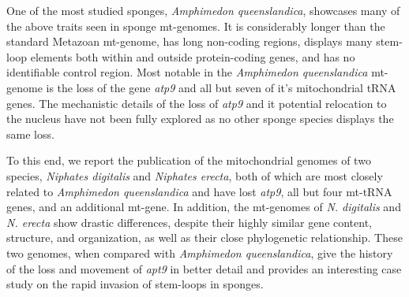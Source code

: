 \documentclass[../main.tex]{subfiles}
\begin{document}
One of the most studied sponges, \emph{Amphimedon queenslandica}, showcases many of the above traits seen in sponge mt-genomes. It is considerably longer than the standard Metazoan mt-genome, has long non-coding regions, displays many stem-loop elements both within and outside protein-coding genes, and has no identifiable control region. Most notable in the \emph{Amphimedon queenslandica} mt-genome is the loss of the gene \emph{atp9} and all but seven of it's mitochondrial tRNA genes. The mechanistic details of the loss of \emph{atp9} and it potential relocation to the nucleus have not been fully explored as no other sponge species displays the same loss.

To this end, we report the publication of the mitochondrial genomes of two species, \emph{Niphates digitalis} and \emph{Niphates erecta}, both of which are most closely related to \emph{Amphimedon queenslandica} and have lost \emph{atp9}, all but four mt-tRNA genes, and an additional mt-gene. In addition, the mt-genomes of \emph{N. digitalis} and \emph{N. erecta} show drastic differences, despite their highly similar gene content, structure, and organization, as well as their close phylogenetic relationship. These two genomes, when compared with \emph{Amphimedon queenslandica}, give the history of the loss and movement of \emph{apt9} in better detail and provides an interesting case study on the rapid invasion of stem-loops in sponges.
\end{document}
